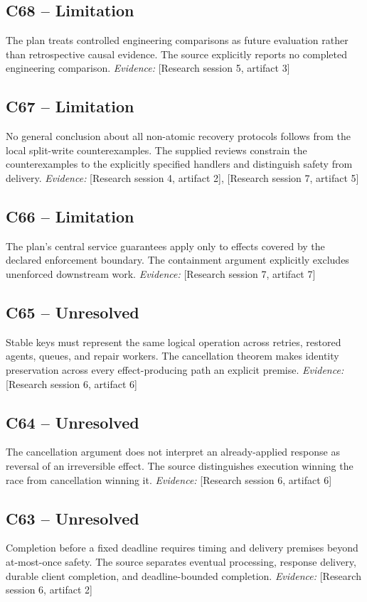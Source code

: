 \documentclass[11pt]{article}
\begin{document}
\begin{sloppypar}
\subsection{C68 -- Limitation}
The plan treats controlled engineering comparisons as future evaluation rather than retrospective causal evidence.
The source explicitly reports no completed engineering comparison.
\textit{Evidence: }[Research session 5, artifact 3]
\subsection{C67 -- Limitation}
No general conclusion about all non-atomic recovery protocols follows from the local split-write counterexamples.
The supplied reviews constrain the counterexamples to the explicitly specified handlers and distinguish safety from delivery.
\textit{Evidence: }[Research session 4, artifact 2], [Research session 7, artifact 5]
\subsection{C66 -- Limitation}
The plan's central service guarantees apply only to effects covered by the declared enforcement boundary.
The containment argument explicitly excludes unenforced downstream work.
\textit{Evidence: }[Research session 7, artifact 7]
\subsection{C65 -- Unresolved}
Stable keys must represent the same logical operation across retries, restored agents, queues, and repair workers.
The cancellation theorem makes identity preservation across every effect-producing path an explicit premise.
\textit{Evidence: }[Research session 6, artifact 6]
\subsection{C64 -- Unresolved}
The cancellation argument does not interpret an already-applied response as reversal of an irreversible effect.
The source distinguishes execution winning the race from cancellation winning it.
\textit{Evidence: }[Research session 6, artifact 6]
\subsection{C63 -- Unresolved}
Completion before a fixed deadline requires timing and delivery premises beyond at-most-once safety.
The source separates eventual processing, response delivery, durable client completion, and deadline-bounded completion.
\textit{Evidence: }[Research session 6, artifact 2]

\end{sloppypar}
\end{document}
